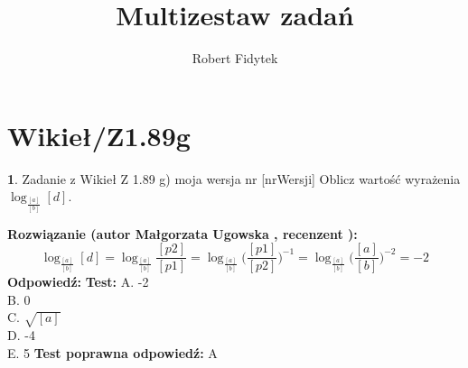 \documentclass[12pt, a4paper]{article}
\title{Multizestaw zadań}
\author{Robert Fidytek}
\date{}
\theoremstyle{definition} %
\newtheorem{zad}{}
\newcommand{\kategoria}[1]{\section{#1}} %
\newcommand{\zadStart}[1]{\begin{zad}#1\newline} %
\newcommand{\zadStop}{\end{zad}}   %
\newcommand{\rozwStart}[2]{\noindent \textbf{Rozwiązanie (autor #1 , recenzent #2): }\newline} %
\newcommand{\rozwStop}{\newline}                                            %
\newcommand{\odpStart}{\noindent \textbf{Odpowiedź:}\newline}    %
\newcommand{\odpStop}{\newline}                                             %
\newcommand{\testStart}{\noindent \textbf{Test:}\newline} %
\newcommand{\testStop}{\newline} %
\newcommand{\kluczStart}{\noindent \textbf{Test poprawna odpowiedź:}\newline} %
\newcommand{\kluczStop}{\newline} %
\begin{document}
\maketitle


\kategoria{Wikieł/Z1.89g}
\zadStart{Zadanie z Wikieł Z 1.89 g) moja wersja nr [nrWersji]}
Oblicz warto\'sć wyrażenia $\log_{\frac{[a]}{[b]}}{[d]}$.
\zadStop
\rozwStart{Małgorzata Ugowska}{}
$$\log_{\frac{[a]}{[b]}}{[d]} = \log_{\frac{[a]}{[b]}}{\frac{[p2]}{[p1]}} =  \log_{\frac{[a]}{[b]}}{\Big(\frac{[p1]}{[p2]}\Big)^{-1}}=\log_{\frac{[a]}{[b]}}{\Big(\frac{[a]}{[b]}\Big)^{-2}}= -2 $$
\rozwStop
\odpStart
-2
\odpStop
\testStart
A. -2\\
B. 0\\
C. $\sqrt{[a]}$\\
D. -4\\
E. 5
\testStop
\kluczStart
A
\kluczStop
\end{document}
